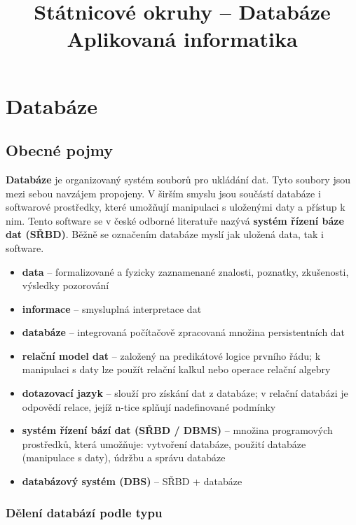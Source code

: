 \documentclass[12pt,a4paper]{article}
\title{\textbf{Státnicové okruhy -- Databáze}\\
\large Aplikovaná informatika}
\author{}
\date{}
\begin{document}
\maketitle
\tableofcontents
\newpage

\section{Databáze}

\subsection*{Obecné pojmy}

\textbf{Databáze} je organizovaný systém souborů pro ukládání dat. Tyto soubory jsou mezi sebou navzájem
propojeny. V širším smyslu jsou součástí databáze i softwarové prostředky, které umožňují manipulaci
s uloženými daty a přístup k nim. Tento software se v české odborné literatuře nazývá \textbf{systém řízení
báze dat (SŘBD)}. Běžně se označením databáze myslí jak uložená data, tak i software.

\begin{itemize}
  \item \textbf{data} -- formalizované a fyzicky zaznamenané znalosti, poznatky, zkušenosti, výsledky pozorování
  \item \textbf{informace} -- smysluplná interpretace dat
  \item \textbf{databáze} -- integrovaná počítačově zpracovaná množina persistentních dat
  \item \textbf{relační model dat} -- založený na predikátové logice prvního řádu; k manipulaci s daty
    lze použít relační kalkul nebo operace relační algebry
  \item \textbf{dotazovací jazyk} -- slouží pro získání dat z databáze; v relační databázi je odpovědí relace,
    jejíž n-tice splňují nadefinované podmínky
  \item \textbf{systém řízení bází dat (SŘBD / DBMS)} -- množina programových prostředků, která umožňuje:
    vytvoření databáze, použití databáze (manipulace s daty), údržbu a správu databáze
  \item \textbf{databázový systém (DBS)} -- SŘBD + databáze
\end{itemize}

\subsubsection*{Dělení databází podle typu}
\end{document}

